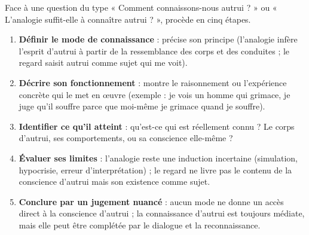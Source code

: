 \documentclass[11pt]{article}
\newcommand{\cle}[1]{{\popxbold\color{popdark}#1}}
\begin{document}
\begin{methode}
Face à une question du type « Comment connaissons-nous autrui ? » ou « L'analogie suffit-elle à connaître autrui ? », procède en cinq étapes.
\begin{enumerate}
\item \textbf{Définir le mode de connaissance} : précise son principe (l'\cle{analogie} infère l'esprit d'autrui à partir de la ressemblance des corps et des conduites ; le \cle{regard} saisit autrui comme sujet qui me voit).
\item \textbf{Décrire son fonctionnement} : montre le raisonnement ou l'expérience concrète qui le met en œuvre (exemple : je vois un homme qui grimace, je juge qu'il souffre parce que moi-même je grimace quand je souffre).
\item \textbf{Identifier ce qu'il atteint} : qu'est-ce qui est réellement connu ? Le corps d'autrui, ses comportements, ou sa \cle{conscience} elle-même ?
\item \textbf{Évaluer ses limites} : l'analogie reste une induction incertaine (simulation, hypocrisie, erreur d'interprétation) ; le regard ne livre pas le contenu de la conscience d'autrui mais son existence comme sujet.
\item \textbf{Conclure par un jugement nuancé} : aucun mode ne donne un accès direct à la conscience d'autrui ; la connaissance d'autrui est toujours médiate, mais elle peut être complétée par le dialogue et la \cle{reconnaissance}.
\end{enumerate}
\end{methode}
\end{document}
